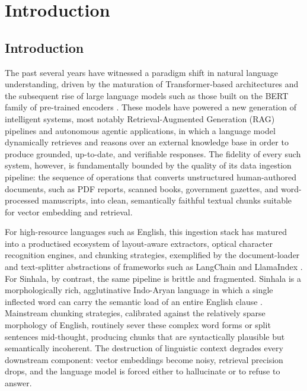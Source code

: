 \documentclass[12pt,a4paper,oneside]{report}
\begin{document}
\chapter{Introduction}
\label{ch:introduction}

\section{Introduction}
The past several years have witnessed a paradigm shift in natural language understanding, driven by the maturation of Transformer-based architectures \cite{vaswani2017attention} and the subsequent rise of large language models such as those built on the BERT family of pre-trained encoders \cite{devlin2019bert}. These models have powered a new generation of intelligent systems, most notably Retrieval-Augmented Generation (RAG) pipelines \cite{lewis2020rag} and autonomous agentic applications, in which a language model dynamically retrieves and reasons over an external knowledge base in order to produce grounded, up-to-date, and verifiable responses. The fidelity of every such system, however, is fundamentally bounded by the quality of its data ingestion pipeline: the sequence of operations that converts unstructured human-authored documents, such as PDF reports, scanned books, government gazettes, and word-processed manuscripts, into clean, semantically faithful textual chunks suitable for vector embedding and retrieval.

For high-resource languages such as English, this ingestion stack has matured into a productised ecosystem of layout-aware extractors, optical character recognition engines, and chunking strategies, exemplified by the document-loader and text-splitter abstractions of frameworks such as LangChain \cite{langchain2024} and LlamaIndex \cite{llamaindex2024}. For Sinhala, by contrast, the same pipeline is brittle and fragmented. Sinhala is a morphologically rich, agglutinative Indo-Aryan language in which a single inflected word can carry the semantic load of an entire English clause \cite{pathirana2025sinmorphy}. Mainstream chunking strategies, calibrated against the relatively sparse morphology of English, routinely sever these complex word forms or split sentences mid-thought, producing chunks that are syntactically plausible but semantically incoherent. The destruction of linguistic context degrades every downstream component: vector embeddings become noisy, retrieval precision drops, and the language model is forced either to hallucinate or to refuse to answer.
\end{document}
